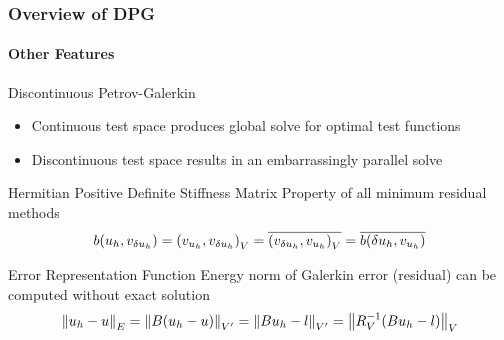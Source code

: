 \documentclass[18pt,xcolor=table]{beamer}
\begin{document}
\begin{frame}[t]
\frametitle{Overview of DPG}
\framesubtitle{Other Features}
\begin{block}{Discontinuous Petrov-Galerkin}
\begin{itemize}
  \item Continuous test space produces global solve for optimal test functions
  \item Discontinuous test space results in an embarrassingly parallel solve
\end{itemize}
\end{block}
\begin{block}{Hermitian Positive Definite Stiffness Matrix}
Property of all minimum residual methods
\[
b(u_h,v_{\delta u_h})=\left( v_{u_h},v_{\delta u_h} \right)_V=\overline{\left( v_{\delta u_h},v_{u_h} \right)_V}=\overline{b(\delta u_h,v_{u_h})}
\]
\end{block}
\begin{block}{Error Representation Function}
Energy norm of Galerkin error (residual) can be computed without exact solution
\[
\left\| u_h-u \right\|_E=\left\| B(u_h-u) \right\|_{V'}=\left\| Bu_h-l \right\|_{V'}=\left\| R_V^{-1}(Bu_h-l) \right\|_V
\]
\end{block}
\end{frame}
\end{document}
